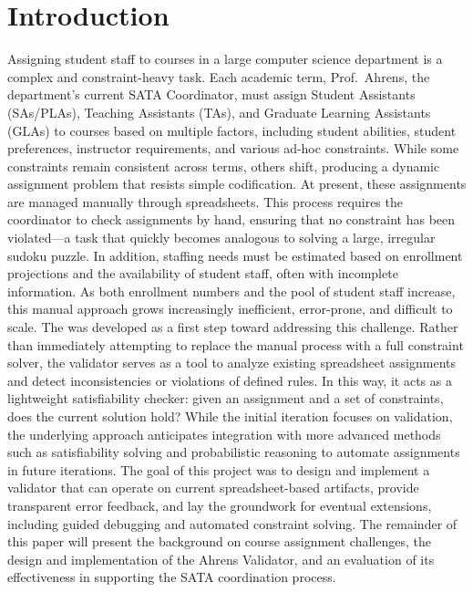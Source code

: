 \section{Introduction} %
Assigning student staff to courses in a large computer science department is a complex and constraint-heavy task.
Each academic term, Prof.~Ahrens, the department’s current SATA Coordinator,
must assign Student Assistants (SAs/PLAs), Teaching Assistants (TAs), and Graduate Learning Assistants (GLAs)
to courses based on multiple factors, including student abilities, student preferences, instructor requirements,
and various ad-hoc constraints.
While some constraints remain consistent across terms, others shift,
producing a dynamic assignment problem that resists simple codification.
At present, these assignments are managed manually through spreadsheets.
This process requires the coordinator to check assignments by hand,
ensuring that no constraint has been violated---a task that quickly becomes analogous to solving a large,
irregular sudoku puzzle.
In addition, staffing needs must be estimated based on enrollment projections and the availability of student staff,
often with incomplete information.
As both enrollment numbers and the pool of student staff increase,
this manual approach grows increasingly inefficient, error-prone,
and difficult to scale.
The \tool was developed as a first step toward addressing this challenge.
Rather than immediately attempting to replace the manual process with a full constraint solver,
the validator serves as a tool to analyze existing spreadsheet assignments and detect inconsistencies
or violations of defined rules.
In this way, it acts as a lightweight satisfiability checker:
given an assignment and a set of constraints, does the current solution hold?
While the initial iteration focuses on validation,
the underlying approach anticipates integration with more advanced methods such
as satisfiability solving and probabilistic reasoning to automate assignments in future iterations.
The goal of this project was to design and implement a validator that can operate on current
spreadsheet-based artifacts, provide transparent error feedback,
and lay the groundwork for eventual extensions, including guided debugging and automated constraint solving.
The remainder of this paper will present the background on course assignment challenges,
the design and implementation of the Ahrens Validator, and an evaluation of its effectiveness in supporting the SATA coordination process.
